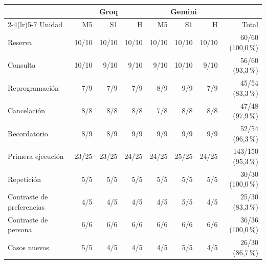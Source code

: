 \setlength{\tabcolsep}{4.5pt}\begin{tabular}{lrrrrrrr}\toprule
& \multicolumn{3}{c}{Groq} & \multicolumn{3}{c}{Gemini} & \\ \cmidrule(lr){2-4}\cmidrule(lr){5-7}
Unidad & M5 & S1 & H & M5 & S1 & H & Total \\ \midrule
Reserva & 10/10 & 10/10 & 10/10 & 10/10 & 10/10 & 10/10 & 60/60 (100,0\,\%) \\
Consulta & 10/10 & 9/10 & 9/10 & 9/10 & 10/10 & 9/10 & 56/60 (93,3\,\%) \\
Reprogramación & 7/9 & 7/9 & 7/9 & 8/9 & 9/9 & 7/9 & 45/54 (83,3\,\%) \\
Cancelación & 8/8 & 8/8 & 8/8 & 7/8 & 8/8 & 8/8 & 47/48 (97,9\,\%) \\
Recordatorio & 8/9 & 8/9 & 9/9 & 9/9 & 9/9 & 9/9 & 52/54 (96,3\,\%) \\
\midrule
Primera ejecución & 23/25 & 23/25 & 24/25 & 24/25 & 25/25 & 24/25 & 143/150 (95,3\,\%) \\
Repetición & 5/5 & 5/5 & 5/5 & 5/5 & 5/5 & 5/5 & 30/30 (100,0\,\%) \\
Contraste de preferencias & 4/5 & 4/5 & 4/5 & 4/5 & 5/5 & 4/5 & 25/30 (83,3\,\%) \\
Contraste de persona & 6/6 & 6/6 & 6/6 & 6/6 & 6/6 & 6/6 & 36/36 (100,0\,\%) \\
Casos nuevos & 5/5 & 4/5 & 4/5 & 4/5 & 5/5 & 4/5 & 26/30 (86,7\,\%) \\
\bottomrule\end{tabular}
